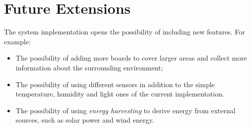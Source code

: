 \section{Future Extensions}
The system implementation opens the possibility of including new features. For example:

\begin{itemize}
	\item The possibility of adding more boards to cover larger areas and collect more information about the surrounding environment;
	\item The possibility of using different sensors in addition to the simple temperature, humidity and light ones of the current implementation.
	\item The possibility of using \textit{energy harvesting} to derive energy from external sources, such as solar power and wind energy.
\end{itemize}